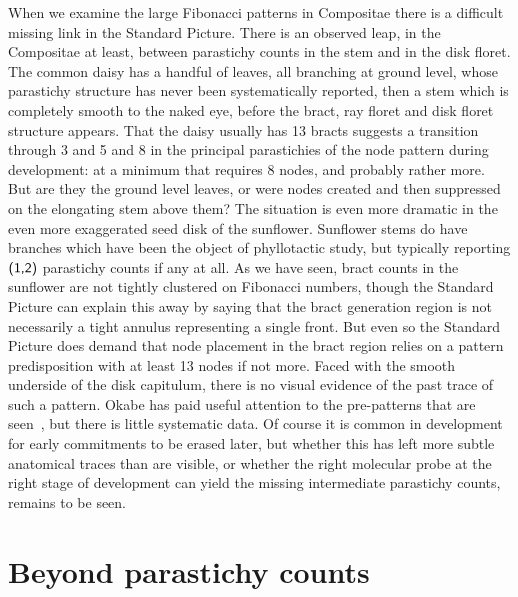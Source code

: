 When we examine the large Fibonacci patterns in {Compositae}  there is a difficult missing link in the Standard Picture. There is an observed leap, in the {Compositae} at least, between parastichy counts in the stem and in the disk floret. The common daisy has a handful of leaves, all branching at ground level, whose parastichy structure has never been systematically reported, then a stem which is completely smooth to the naked eye, before the bract, ray floret and disk floret structure appears. That the daisy usually has 13 bracts suggests a transition through 3 and 5 and 8 in the principal parastichies of the node pattern during development: at a minimum that requires 8 nodes, and probably rather more. But are they the ground level leaves, or were nodes created and then suppressed on the elongating stem above them? The situation is even more dramatic in the even more exaggerated seed disk of the sunflower. Sunflower stems do have branches which have been the object of phyllotactic study, but typically reporting $\textsf{(1,2)}$ parastichy counts if any at all. As we have seen, bract counts in the sunflower are not tightly clustered on Fibonacci numbers, though the Standard Picture can explain this away by saying that the bract generation region is not necessarily a tight annulus representing a single front. But even so the Standard Picture does demand that node placement in the bract region relies on a pattern predisposition with at least 13 nodes if not more. Faced with the smooth underside of the disk capitulum, there is no visual evidence of the past trace of such a pattern. Okabe has paid useful  attention to the pre-patterns that are seen~\autocite{okabeBiophysicalOptimalityGolden2015}, but there is little systematic data. Of course it is common in development for early commitments to be erased later, but whether this has left more subtle anatomical traces than are visible, or whether the right molecular probe at the right stage of development can yield the missing intermediate parastichy counts, remains to be seen. 

 \section{Beyond parastichy counts}
 
